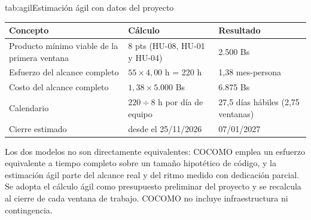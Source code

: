 \begin{tablaapa}{tab:agil}{Estimación ágil con datos del proyecto}
\small
\begin{tabular}{@{}p{4.6cm}p{5.6cm}p{4.4cm}@{}}
\toprule
Concepto & Cálculo & Resultado \\
\midrule
Producto mínimo viable de la primera ventana & 8 pts (HU-08, HU-01 y
HU-04) & 2.500 Bs \\
Esfuerzo del alcance completo & $55 \times 4{,}00$ h = 220 h & 1,38
mes-persona \\
Costo del alcance completo & $1{,}38 \times 5.000$ Bs & 6.875 Bs \\
Calendario & $220 \div 8$ h por día de equipo & 27,5 días hábiles (2,75
ventanas) \\
Cierre estimado & desde el 25/11/2026 & 07/01/2027 \\
\bottomrule
\end{tabular}
\end{tablaapa}

Los dos modelos no son directamente equivalentes: COCOMO emplea un esfuerzo
equivalente a tiempo completo sobre un tamaño hipotético de código, y la
estimación ágil parte del alcance real y del ritmo medido con dedicación
parcial. Se adopta el cálculo ágil como presupuesto preliminar del proyecto y
se recalcula al cierre de cada ventana de trabajo. COCOMO no incluye
infraestructura ni contingencia.
